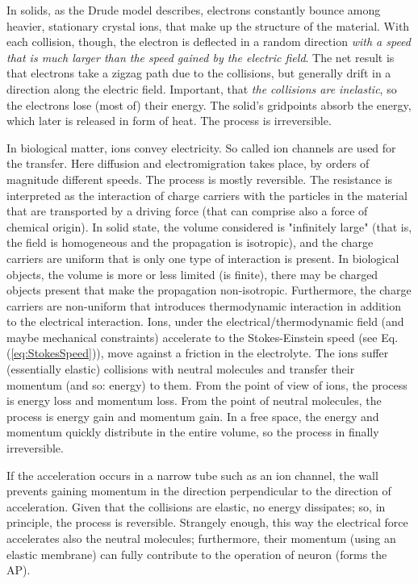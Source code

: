 In solids, as the Drude model describes, 
electrons constantly bounce among heavier, stationary crystal ions, that make up the structure of the material. With each collision, though, the electron is deflected in a random direction \textit{with a speed that is much larger than the speed gained by the electric field}. The net result is that electrons take a zigzag path due to the collisions, but generally drift in a direction along the electric field. Important, that \textit{the collisions are inelastic}, so the electrons lose (most of) their energy. The solid's gridpoints absorb the energy, which later is released in form of heat. The process is irreversible.
\else

\fi

\ifx\magyar\undefined
In biological matter, ions convey electricity. So called ion channels
are used for the transfer. Here diffusion and electromigration takes place, by orders of magnitude different speeds. 
The process is mostly reversible. The resistance 
is interpreted as the interaction of charge carriers with the particles in the material that are transported by a driving force (that can comprise also a force of chemical origin).
In solid state, the volume considered is "infinitely large" (that is, the field is homogeneous
and the propagation is isotropic), and the charge carriers are uniform that is only one type of interaction is present.
In biological objects, the volume is more or less limited (is finite), there may be charged objects present that make the propagation non-isotropic. Furthermore, the charge carriers are non-uniform
that introduces thermodynamic interaction in addition to the electrical interaction.
Ions, under the electrical/thermodynamic field (and maybe mechanical constraints) accelerate to the Stokes-Einstein speed (see Eq.(\ref{eq:StokesSpeed})), move against a friction in the electrolyte.
The ions suffer (essentially elastic) collisions with neutral molecules and transfer their momentum (and so: energy) to them. 
From the point of view of ions, the process is energy loss and momentum loss.
From the point of neutral molecules, the process is energy gain and momentum gain. In a free space, the energy and momentum quickly distribute in the entire volume, so the
process in finally irreversible.

If the acceleration occurs in a narrow tube 
such as an ion channel, the wall prevents gaining momentum in the 
direction perpendicular to the direction of acceleration. 
Given that the collisions are elastic, no energy dissipates;
so, in principle, the process is reversible.
Strangely enough, this way the electrical force
accelerates also the neutral molecules; furthermore, their momentum (using an elastic membrane) can fully contribute to the operation
of neuron (forms the \gls{AP}). 
\else

